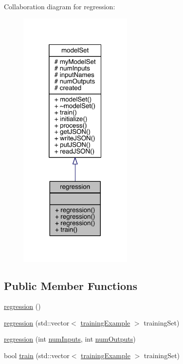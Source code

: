 Collaboration diagram for regression\+:\nopagebreak
\begin{figure}[H]
\begin{center}
\leavevmode
\includegraphics[width=160pt]{classregression__coll__graph}
\end{center}
\end{figure}
\subsection*{Public Member Functions}
\begin{DoxyCompactItemize}
\item 
\hyperlink{classregression_a40993153659b1f637cf4d596df6e97ab}{regression} ()
\item 
\hyperlink{classregression_ad03f74e09d96f315de3933628e8f4138}{regression} (std\+::vector$<$ \hyperlink{structtraining_example}{training\+Example} $>$ training\+Set)
\item 
\hyperlink{classregression_a9d38dcda0e5c99caf0faf85f98a5ebb3}{regression} (int \hyperlink{classmodel_set_ad10fbc1228a85f1200cb89589ad92755}{num\+Inputs}, int \hyperlink{classmodel_set_addc0df56b9f1970c9816050634933716}{num\+Outputs})
\item 
bool \hyperlink{classregression_ae45d7dbf24cab75202d966d116829813}{train} (std\+::vector$<$ \hyperlink{structtraining_example}{training\+Example} $>$ training\+Set)
\end{DoxyCompactItemize}
